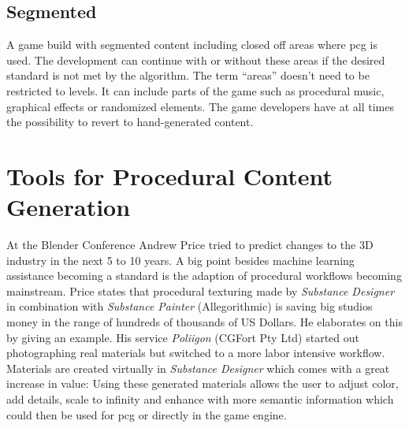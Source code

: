 \documentclass[10pt,a4paper]{article}
\begin{document}
\subsection{Segmented}
\begin{multicols}{2} A game build with segmented content including closed off areas where \gls{pcg} is used. The development can continue with or without these areas if the desired standard is not met by the algorithm. The term “areas” doesn’t need to be restricted to levels. It can include parts of the game such as procedural music, graphical effects or randomized elements. The game developers have at all times the possibility to revert to hand-generated content.
\end{multicols}
\section{Tools for Procedural Content Generation}
\begin{multicols}{2}
At the Blender Conference Andrew Price tried to predict changes to the 3D industry in the next 5 to 10 years. A big point besides machine learning assistance becoming a standard is the adaption of procedural workflows becoming mainstream\cite{Price2018}. Price states that procedural texturing made by \textit{Substance Designer} in combination with \textit{Substance Painter} (Allegorithmic) is saving big studios money in the range of hundreds of thousands of US Dollars. He elaborates on this by giving an example. His service \textit{Poliigon} (CGFort Pty Ltd) started out photographing real materials but switched to a more labor intensive workflow. Materials are created virtually in \textit{Substance Designer} which comes with a great increase in value: Using these generated materials allows the user to adjust color, add details, scale to infinity and enhance with more semantic information which could then be used for \gls{pcg} or directly in the game engine.
\end{multicols}
\end{document}
